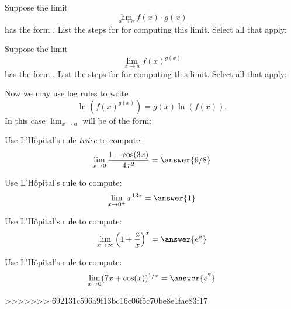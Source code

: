 \begin{problem}
  Suppose the limit
  \[
  \lim_{x\to a} f(x) \cdot g(x)
  \]
  has the form \zeroTimesInfty.  List the steps for for computing this
  limit.  Select all that apply:
  \begin{selectAll}
  \end{selectAll}
\end{problem}


\begin{problem}
  Suppose the limit
  \[
  \lim_{x\to a} f(x)^{g(x)}
  \]
  has the form \oneToInfty.  List the steps for for computing this
  limit.  Select all that apply:
  \begin{selectAll}
  \end{selectAll}
  \begin{problem}
    Now we may use log rules to write
    \[
    \ln(f(x)^{g(x)}) = g(x)\ln(f(x)).
    \]
    In this case $\lim_{x\to a}$ will be of the form:
    \begin{multipleChoice}
      \choice{\numOverZero}
      \choice{\zeroOverZero}
      \choice[correct]{\zeroTimesInfty}
    \end{multipleChoice}
  \end{problem}
\end{problem}


\begin{problem}
  Use L'H\^opital's rule \textit{twice} to compute:
  \[
  \lim_{x\to 0} \frac{1-\cos(3x)}{4x^2} = \answer{9/8}
  \]
\end{problem}


\begin{problem}
  Use L'H\^opital's rule to compute:
  \[
  \lim_{x\to 0^+} x^{13x}= \answer{1}
  \]
\end{problem}


\begin{problem}
  Use L'H\^opital's rule to compute:
  \[
  \lim_{x\to \infty}\left(1+\frac{a}{x}\right)^x = \answer{e^a}
  \]
\end{problem}

\begin{problem}
  Use L'H\^opital's rule to compute:
  \[
  \lim_{x\to 0}(7x+\cos(x))^{1/x} = \answer{e^7}
  \]
\end{problem}



>>>>>>> 692131c596a9f13bc16c06f5c70be8e1fae83f17
